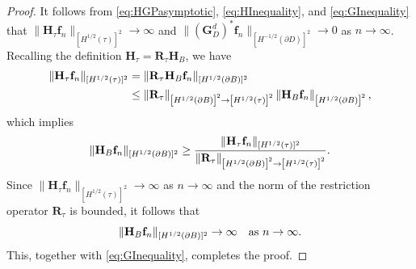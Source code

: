 \documentclass[10pt,a4paper]{amsart}
\begin{document}
\begin{proof}
It follows from \eqref{eq:HGPasymptotic}, \eqref{eq:HInequality}, and \eqref{eq:GInequality} that 
$\|\mathbf{H}_{\tau} \mathbf{f}_n\|_{[H^{1/2}(\tau)]^2} \to \infty$ and 
$\|(\mathbf{G}_D^d)^* \mathbf{f}_n\|_{[H^{-1/2}(\partial D)]^2} \to 0$ as $n \to \infty$. 
Recalling the definition $\mathbf{H}_{\tau} = \mathbf{R}_{\tau} \mathbf{H}_B$, we have
\begin{equation}\notag
\begin{aligned}
\|\mathbf{H}_{\tau} \mathbf{f}_n\|_{[H^{1/2}(\tau)]^2} 
&= \|\mathbf{R}_{\tau} \mathbf{H}_B \mathbf{f}_n\|_{[H^{1/2}(\partial B)]^2} \\
& \leq \left\|\mathbf R_{\tau}\right\|_{\left[H^{1/2}\left(\partial B \right) \right]^2 \to \left[H^{1/2}\left(\tau \right) \right]^2 } \left\| \mathbf H_{B} \mathbf f_n \right\|_{\left[H^{1/2}\left(\partial B \right) \right]^2 },
\end{aligned}
\end{equation}
which implies
\begin{equation}\notag 
\|\mathbf{H}_B \mathbf{f}_n\|_{[H^{1/2}(\partial B)]^2} 
\geq \frac{\|\mathbf{H}_{\tau} \mathbf{f}_n\|_{[H^{1/2}(\tau)]^2}}{\left\|\mathbf R_{\tau}\right\|_{\left[H^{1/2}\left(\partial B \right) \right]^2 \to \left[H^{1/2}\left(\tau \right) \right]^2 }}.
\end{equation}
Since $\|\mathbf{H}_{\tau} \mathbf{f}_n\|_{[H^{1/2}(\tau)]^2} \to \infty$ as $n \to \infty$ and the norm of the restriction operator $\mathbf{R}_{\tau}$ is bounded, it follows that
\begin{equation}\notag
\|\mathbf{H}_B \mathbf{f}_n\|_{[H^{1/2}(\partial B)]^2} \to \infty \quad \text{as } n \to \infty.
\end{equation}
This, together with \eqref{eq:GInequality}, completes the proof.

\end{proof}
\end{document}
